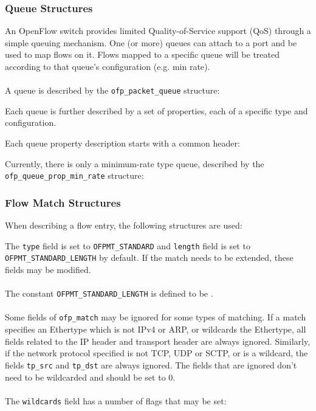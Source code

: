 \subsubsection{Queue Structures}
\label{cts:qos}
An OpenFlow switch provides limited Quality-of-Service support
  (QoS) through a simple queuing
mechanism. One (or more) queues can attach to a port and be used to map flows
on it. Flows mapped to a specific queue will be treated according to
that queue's configuration (e.g. min rate).
\\\\
A queue is described by the \verb|ofp_packet_queue| structure:

Each queue is further described by a set of properties, each of a
specific type and configuration.

Each queue property description starts with a common header:

Currently, there is only a minimum-rate type queue, described by the
\verb|ofp_queue_prop_min_rate| structure:


\subsubsection{Flow Match Structures}
When describing a flow entry, the following structures are used:




The \verb|type| field is set to \verb|OFPMT_STANDARD| and \verb|length| field is set to \verb|OFPMT_STANDARD_LENGTH| by default. If the match needs to be extended, these fields may be modified.
\\\\
The constant \verb|OFPMT_STANDARD_LENGTH| is defined to be .
\\\\
Some fields of \verb|ofp_match| may be ignored for some types of matching. If a match specifies an Ethertype which is not IPv4 or ARP, or wildcards the Ethertype, all fields related to the IP header and transport header are always ignored. Similarly, if the network protocol specified is not TCP, UDP or SCTP, or is a wildcard, the fields \verb|tp_src| and \verb|tp_dst| are always ignored. The fields that are ignored don't need to be wildcarded and should be set to 0.
\\\\
The \verb|wildcards| field has a number of flags that may be set:

